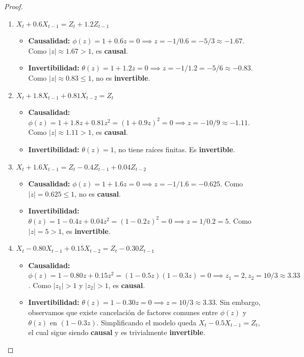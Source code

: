 \documentclass[11pt,letterpaper]{article}
\begin{document}
\begin{proof}
\begin{enumerate}
    \item $X_t + 0.6 X_{t-1} = Z_t + 1.2 Z_{t-1}$
    \begin{itemize}
        \item \textbf{Causalidad:} $\phi(z) = 1 + 0.6z = 0 \implies z = -1 / 0.6 = -5/3 \approx -1.67$.
        Como $|z| \approx 1.67 > 1$, es \textbf{causal}.
        \item \textbf{Invertibilidad:} $\theta(z) = 1 + 1.2z = 0 \implies z = -1 / 1.2 = -5/6 \approx -0.83$.
        Como $|z| \approx 0.83 \le 1$, no es \textbf{invertible}.
    \end{itemize}

    \item $X_t + 1.8 X_{t-1} + 0.81 X_{t-2} = Z_t$
    \begin{itemize}
        \item \textbf{Causalidad:} $\phi(z) = 1 + 1.8z + 0.81z^2 = (1 + 0.9z)^2 = 0 \implies z = -10/9 \approx -1.11$.
        Como $|z| \approx 1.11 > 1$, es \textbf{causal}.
        \item \textbf{Invertibilidad:} $\theta(z) = 1$, no tiene raíces finitas. Es \textbf{invertible}.
    \end{itemize}

    \item $X_t + 1.6 X_{t-1} = Z_t - 0.4 Z_{t-1} + 0.04 Z_{t-2}$
    \begin{itemize}
        \item \textbf{Causalidad:} $\phi(z) = 1 + 1.6z = 0 \implies z = -1 / 1.6 = -0.625$.
        Como $|z| = 0.625 \le 1$, no es \textbf{causal}.
        \item \textbf{Invertibilidad:} $\theta(z) = 1 - 0.4z + 0.04z^2 = (1 - 0.2z)^2 = 0 \implies z = 1 / 0.2 = 5$.
        Como $|z| = 5 > 1$, es \textbf{invertible}.
    \end{itemize}

    \item $X_t - 0.80 X_{t-1} + 0.15 X_{t-2} = Z_t - 0.30 Z_{t-1}$
    \begin{itemize}
        \item \textbf{Causalidad:} $\phi(z) = 1 - 0.80z + 0.15z^2 = (1 - 0.5z)(1 - 0.3z) = 0 \implies z_1 = 2, z_2 = 10/3 \approx 3.33$.
        Como $|z_1| > 1$ y $|z_2| > 1$, es \textbf{causal}.
        \item \textbf{Invertibilidad:} $\theta(z) = 1 - 0.30z = 0 \implies z = 10/3 \approx 3.33$.
        Sin embargo, observamos que existe cancelación de factores comunes entre $\phi(z)$ y $\theta(z)$ en $(1 - 0.3z)$. Simplificando el modelo queda $X_t - 0.5 X_{t-1} = Z_t$, el cual sigue siendo \textbf{causal} y es trivialmente \textbf{invertible}.
    \end{itemize}


\end{enumerate}
\end{proof}
\end{document}
